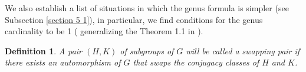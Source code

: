 \documentclass[a4paper,12pt]{article}
\newtheorem{thm}{Theorem}[section]
\newtheorem{deff}[thm]{Definition}
\newcommand{\Oe}{\rm \widehat{OE}}
\begin{document}


 

We also establish a list of situations in which the genus formula is simpler (see Subsection \ref{section 5 1}), in particular, we find conditions for the genus cardinality to be  1 ( generalizing the Theorem 1.1 in \cite{BZ}). 

\begin{deff} A pair $(H,K)$ of subgroups of $G$ will be called a swapping pair if there exists an automorphism of $G$ that swaps the conjugacy classes of $H$ and $K$.  \end{deff}
\end{document}
